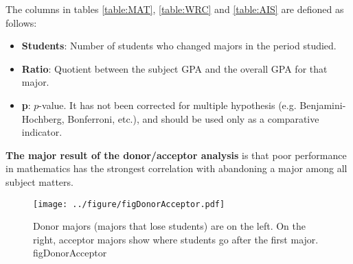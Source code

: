 The columns in tables \ref{table:MAT}, \ref {table:WRC} and \ref{table:AIS} are defioned as follows: 
\begin{itemize}
	\item \textbf{Students}: Number of students who changed majors in the period studied. 
	\item \textbf{Ratio}: Quotient between the subject GPA and the overall GPA for that major.
	\item \textbf{p}: $p$-value. It has not been corrected for multiple hypothesis (e.g. Benjamini-Hochberg, Bonferroni, etc.), and should be used only as a comparative indicator. 
\end{itemize}
 
\textbf{The major result of the donor/acceptor analysis} is that poor performance in mathematics has the strongest correlation with abandoning a major among all subject matters.  

\newpage

\begin{sidewaysfigure}[ht]
  \centering 
    \texttt{[image: ../figure/figDonorAcceptor.pdf]}
    \caption{Donor majors (majors that lose students) are on the left. On the right, acceptor majors show where students go after the first major. figDonorAcceptor}
    \label{fig:../figure/figDonorAcceptor}
\end{sidewaysfigure}


\newpage

